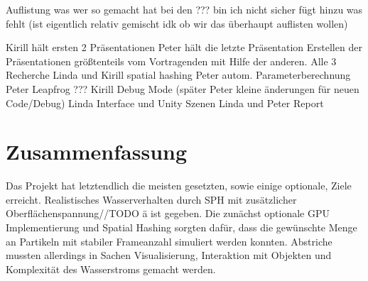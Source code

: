 \documentclass[a4paper]{paper}
\begin{document}
Auflistung was wer so gemacht hat bei den ??? bin ich nicht sicher
fügt hinzu was fehlt (ist eigentlich relativ gemischt idk ob wir das überhaupt auflisten wollen)

Kirill hält ersten 2 Präsentationen
Peter hält die letzte Präsentation
Erstellen der Präsentationen größtenteils vom Vortragenden mit Hilfe der anderen.
Alle 3 Recherche
Linda und Kirill spatial hashing
Peter autom. Parameterberechnung
Peter Leapfrog
??? Kirill Debug Mode (später Peter kleine änderungen für neuen Code/Debug)
Linda Interface und Unity Szenen
Linda und Peter Report

\section{Zusammenfassung}
Das Projekt hat letztendlich die meisten gesetzten, sowie einige optionale, Ziele erreicht. Realistisches Wasserverhalten durch SPH mit zusätzlicher Oberflächenspannung//TODO ä ist gegeben. Die zunächst optionale GPU Implementierung und Spatial Hashing sorgten dafür, dass die gewünschte Menge an Partikeln mit stabiler Frameanzahl simuliert werden konnten. Abstriche mussten allerdings in Sachen Visualisierung, Interaktion mit Objekten und Komplexität des Wasserstroms gemacht werden. 



\end{document}
